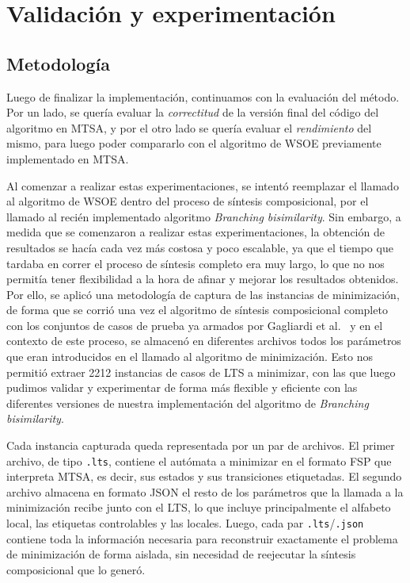 \chapter{Validación y experimentación}
\label{cap:experimentacion}

\section{Metodología}
Luego de finalizar la implementación, continuamos con la evaluación del método. Por un lado, se quería evaluar la \textit{correctitud} de la versión final del código del algoritmo en MTSA, y por el otro lado se quería evaluar el \textit{rendimiento} del mismo, para luego poder compararlo con el algoritmo de WSOE previamente implementado en MTSA.

Al comenzar a realizar estas experimentaciones, se intentó reemplazar el llamado al algoritmo de WSOE dentro del proceso de síntesis composicional, por el llamado al recién implementado algoritmo \textit{Branching bisimilarity}. Sin embargo, a medida que se comenzaron a realizar estas experimentaciones, la obtención de resultados se hacía cada vez más costosa y poco escalable, ya que el tiempo que tardaba en correr el proceso de síntesis completo era muy largo, lo que no nos permitía tener flexibilidad a la hora de afinar y mejorar los resultados obtenidos. Por ello, se aplicó una metodología de captura de las instancias de minimización, de forma que se corrió una vez el algoritmo de síntesis composicional completo con los conjuntos de casos de prueba ya armados por Gagliardi et al.~\cite{compositional} y en el contexto de este proceso, se almacenó en diferentes archivos todos los parámetros que eran introducidos en el llamado al algoritmo de minimización. Esto nos permitió extraer 2212 instancias de casos de LTS a minimizar, con las que luego pudimos validar y experimentar de forma más flexible y eficiente con las diferentes versiones de nuestra implementación del algoritmo de \textit{Branching bisimilarity}.

Cada instancia capturada queda representada por un par de archivos. El primer archivo, de tipo \texttt{.lts}, contiene el autómata a minimizar en el formato FSP que interpreta MTSA, es decir, sus estados y sus transiciones etiquetadas. El segundo archivo almacena en formato JSON el resto de los parámetros que la llamada a la minimización recibe junto con el LTS, lo que incluye principalmente el alfabeto local, las etiquetas controlables y las locales. Luego, cada par \texttt{.lts}/\texttt{.json} contiene toda la información necesaria para reconstruir exactamente el problema de minimización de forma aislada, sin necesidad de reejecutar la síntesis composicional que lo generó.


